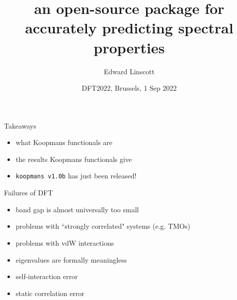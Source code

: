 \documentclass[xcolor=table,aspectratio=169]{beamer}
\title{\noindent\large{an open-source package for accurately predicting spectral properties}}
\author{Edward Linscott}
\institute{Theory and Simulation of Materials, EPFL}
\date{DFT2022, Brussels, 1 Sep 2022}
\numberwithin{equation}{section}
\begin{document}
\frame{\titlepage}

\begin{frame}{Takeaways}
   \begin{itemize}
      \item what Koopmans functionals are
      \item the results Koopmans functionals give
      \item \texttt{koopmans v1.0b} has just been released!
   \end{itemize}



\end{frame}

\begin{frame}{Failures of DFT}
   \begin{itemize}
      \item band gap is almost universally too small
      \item problems with ``strongly correlated" systems (e.g. TMOs)
      \item problems with vdW interactions
      \item eigenvalues are formally meaningless
      \item self-interaction error
      \item static correlation error
   \end{itemize}
\end{frame}
\end{document}
